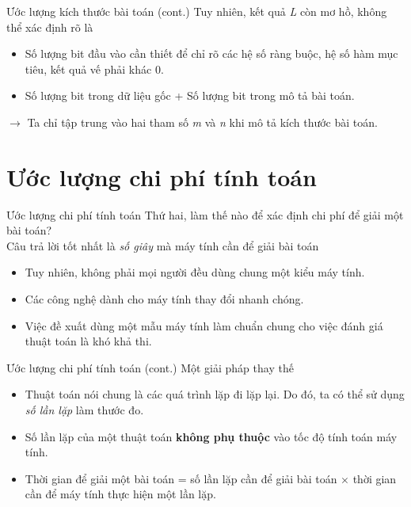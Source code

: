 \documentclass[10pt]{beamer}
\begin{document}
\begin{frame}{Ước lượng kích thước bài toán (cont.)}
Tuy nhiên, kết quả \textit{L} còn mơ hồ, không thể xác định rõ là
\begin{itemize}
\item Số lượng bit đầu vào cần thiết để chỉ rõ các hệ số ràng buộc, hệ số hàm mục tiêu, kết quả vế phải khác 0.
\item Số lượng bit trong dữ liệu gốc + Số lượng bit trong mô tả bài toán.
\end{itemize}
$\rightarrow$ Ta chỉ tập trung vào hai tham số \textit{m} và \textit{n} khi mô tả kích thước bài toán.
\end{frame}


\section{Ước lượng chi phí tính toán}
\begin{frame}{Ước lượng chi phí tính toán}
Thứ hai, làm thế nào để xác định chi phí để giải một bài toán?\\
Câu trả lời tốt nhất là \textit{số giây} mà máy tính cần để giải bài toán
\begin{itemize}
\item Tuy nhiên, không phải mọi người đều dùng chung một kiểu máy tính.
\item Các công nghệ dành cho máy tính thay đổi nhanh chóng.
\item Việc đề xuất dùng một mẫu máy tính làm chuẩn chung cho việc đánh giá thuật toán là khó khả thi.
\end{itemize}
\end{frame}

\begin{frame}{Ước lượng chi phí tính toán (cont.)}
Một giải pháp thay thế
\begin{itemize}
\item Thuật toán nói chung là các quá trình lặp đi lặp lại. Do đó, ta có thể sử dụng \textit{số lần lặp} làm thước đo.
\item Số lần lặp của một thuật toán \textbf{không phụ thuộc} vào tốc độ tính toán máy tính.
\item Thời gian để giải một bài toán = số lần lặp cần để giải bài toán $\times$ thời gian cần để máy tính thực hiện một lần lặp.
\end{itemize}
\end{frame}
\end{document}
